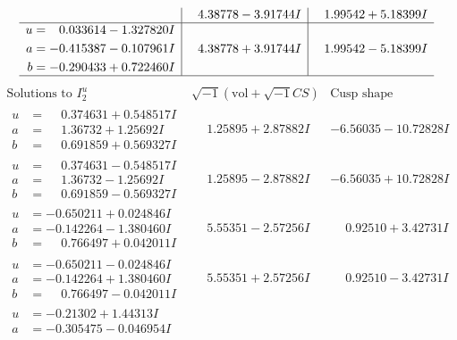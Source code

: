 \documentclass[1p]{elsarticle_modified}
\theoremstyle{definition}
\newcommand{\I}{\sqrt{-1}}
\begin{document}
$$\begin{array}{c|c|c}
 & \phantom{-}4.38778 - 3.91744 I & \phantom{-}1.99542 + 5.18399 I \\ \hline\begin{aligned}
u &= \phantom{-}0.033614 - 1.327820 I \\
a &= -0.415387 - 0.107961 I \\
b &= -0.290433 + 0.722460 I\end{aligned}
 & \phantom{-}4.38778 + 3.91744 I & \phantom{-}1.99542 - 5.18399 I\\
 \hline 
 \end{array}$$\newpage$$\begin{array}{c|c|c}  
\text{Solutions to }I^u_{2}& \I (\text{vol} + \sqrt{-1}CS) & \text{Cusp shape}\\
 \hline 
\begin{aligned}
u &= \phantom{-}0.374631 + 0.548517 I \\
a &= \phantom{-}1.36732 + 1.25692 I \\
b &= \phantom{-}0.691859 + 0.569327 I\end{aligned}
 & \phantom{-}1.25895 + 2.87882 I & -6.56035 - 10.72828 I \\ \hline\begin{aligned}
u &= \phantom{-}0.374631 - 0.548517 I \\
a &= \phantom{-}1.36732 - 1.25692 I \\
b &= \phantom{-}0.691859 - 0.569327 I\end{aligned}
 & \phantom{-}1.25895 - 2.87882 I & -6.56035 + 10.72828 I \\ \hline\begin{aligned}
u &= -0.650211 + 0.024846 I \\
a &= -0.142264 - 1.380460 I \\
b &= \phantom{-}0.766497 + 0.042011 I\end{aligned}
 & \phantom{-}5.55351 - 2.57256 I & \phantom{-}0.92510 + 3.42731 I \\ \hline\begin{aligned}
u &= -0.650211 - 0.024846 I \\
a &= -0.142264 + 1.380460 I \\
b &= \phantom{-}0.766497 - 0.042011 I\end{aligned}
 & \phantom{-}5.55351 + 2.57256 I & \phantom{-}0.92510 - 3.42731 I \\ \hline\begin{aligned}
u &= -0.21302 + 1.44313 I \\
a &= -0.305475 - 0.046954 I \\

\end{aligned}
\end{array}$$
\end{document}
